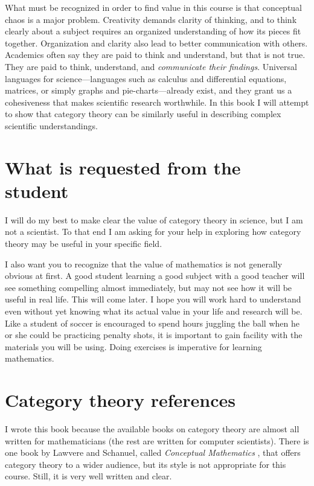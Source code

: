 \documentclass{book}
\theoremstyle{remark}
\theoremstyle{definition}
\begin{document}
What must be recognized in order to find value in this course is that conceptual chaos is a major problem. Creativity demands clarity of thinking, and to think clearly about a subject requires an organized understanding of how its pieces fit together. Organization and clarity also lead to better communication with others. Academics often say they are paid to think and understand, but that is not true. They are paid to think, understand, and {\em communicate their findings}. Universal languages for science---languages such as calculus and differential equations, matrices, or simply graphs and pie-charts---already exist, and they grant us a cohesiveness that makes scientific research worthwhile. In this book I will attempt to show that category theory can be similarly useful in describing complex scientific understandings.



\section{What is requested from the student}

I will do my best to make clear the value of category theory in science, but I am not a scientist. To that end I am asking for your help in exploring how category theory may be useful in your specific field. 

I also want you to recognize that the value of mathematics is not generally obvious at first. A good student learning a good subject with a good teacher will see something compelling almost immediately, but may not see how it will be useful in real life. This will come later. I hope you will work hard to understand even without yet knowing what its actual value in your life and research will be. Like a student of soccer is encouraged to spend hours juggling the ball when he or she could be practicing penalty shots, it is important to gain facility with the materials you will be using. Doing exercises is imperative for learning mathematics.


\section{Category theory references}

I wrote this book because the available books on category theory are almost all written for mathematicians (the rest are written for computer scientists). There is one book by Lawvere and Schanuel, called {\em Conceptual Mathematics} \cite{LS}, that offers category theory to a wider audience, but its style is not appropriate for this course. Still, it is very well written and clear. 
\end{document}
